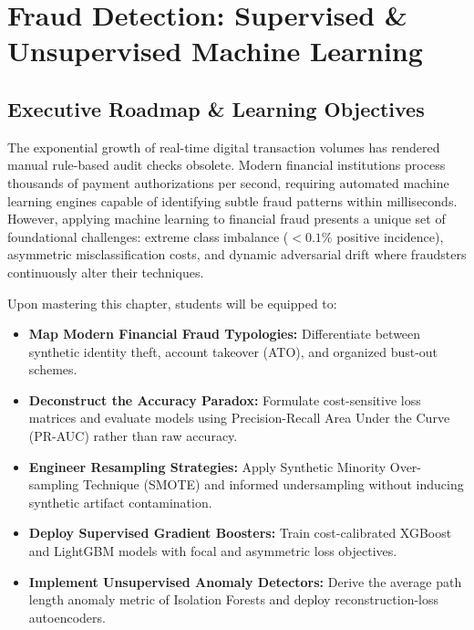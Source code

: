 \chapter{Fraud Detection: Supervised \& Unsupervised Machine Learning}

\section{Executive Roadmap \& Learning Objectives}

The exponential growth of real-time digital transaction volumes has rendered manual rule-based audit checks obsolete. Modern financial institutions process thousands of payment authorizations per second, requiring automated machine learning engines capable of identifying subtle fraud patterns within milliseconds. However, applying machine learning to financial fraud presents a unique set of foundational challenges: extreme class imbalance ($< 0.1\%$ positive incidence), asymmetric misclassification costs, and dynamic adversarial drift where fraudsters continuously alter their techniques.

\begin{tcolorbox}[colback=primarylight, colframe=primarydark, title={\textbf{Core Learning Competencies}}]
Upon mastering this chapter, students will be equipped to:
\begin{itemize}
    \item \textbf{Map Modern Financial Fraud Typologies:} Differentiate between synthetic identity theft, account takeover (ATO), and organized bust-out schemes.
    \item \textbf{Deconstruct the Accuracy Paradox:} Formulate cost-sensitive loss matrices and evaluate models using Precision-Recall Area Under the Curve (PR-AUC) rather than raw accuracy.
    \item \textbf{Engineer Resampling Strategies:} Apply Synthetic Minority Over-sampling Technique (SMOTE) and informed undersampling without inducing synthetic artifact contamination.
    \item \textbf{Deploy Supervised Gradient Boosters:} Train cost-calibrated XGBoost and LightGBM models with focal and asymmetric loss objectives.
    \item \textbf{Implement Unsupervised Anomaly Detectors:} Derive the average path length anomaly metric of Isolation Forests and deploy reconstruction-loss autoencoders.
\end{itemize}
\end{tcolorbox}

